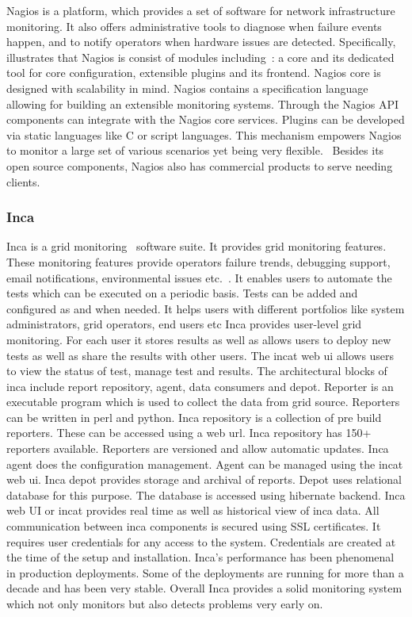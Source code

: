 Nagios is a platform, which provides a set of software for network
infrastructure monitoring. It also offers administrative tools to
diagnose when failure events happen, and to notify operators when
hardware issues are detected. Specifically, illustrates that Nagios is
consist of modules including~\cite{nagios-book}: a core and its
dedicated tool for core configuration, extensible plugins and its
frontend. Nagios core is designed with scalability in mind.  Nagios
contains a specification language allowing for building an extensible
monitoring systems.  Through the Nagios API components can integrate
with the Nagios core services. Plugins can be developed via static
languages like C or script languages. This mechanism empowers Nagios
to monitor a large set of various scenarios yet being very
flexible.~\cite{nagios-paper-2012} Besides its open source components,
Nagios also has commercial products to serve needing clients.


\subsubsection{Inca \cv}

Inca is a grid monitoring~\cite{inca-book} software suite. It provides
grid monitoring features. These monitoring features provide operators
failure trends, debugging support, email notifications, environmental
issues etc.~\cite{www-inca}. It enables users to automate the tests
which can be executed on a periodic basis. Tests can be added and
configured as and when needed. It helps users with different
portfolios like system administrators, grid operators, end users etc
Inca provides user-level grid monitoring. For each user it stores
results as well as allows users to deploy new tests as well as share
the results with other users. The incat web ui allows users to view
the status of test, manage test and results. The architectural blocks
of inca include report repository, agent, data consumers and
depot. Reporter is an executable program which is used to collect the
data from grid source. Reporters can be written in perl and
python. Inca repository is a collection of pre build reporters.  These
can be accessed using a web url. Inca repository has 150+ reporters
available. Reporters are versioned and allow automatic updates. Inca
agent does the configuration management. Agent can be managed using
the incat web ui. Inca depot provides storage and archival of
reports. Depot uses relational database for this purpose. The database
is accessed using hibernate backend.  Inca web UI or incat provides
real time as well as historical view of inca data.  All communication
between inca components is secured using SSL certificates. It requires
user credentials for any access to the system. Credentials are created
at the time of the setup and installation. Inca's performance has been
phenomenal in production deployments. Some of the deployments are
running for more than a decade and has been very stable. Overall Inca
provides a solid monitoring system which not only monitors but also
detects problems very early on.

